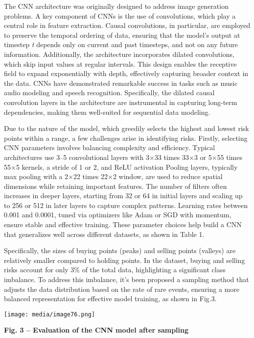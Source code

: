 \documentclass[
]{article}
\begin{document}
The CNN architecture was originally designed to address image generation
problems. A key component of CNNs is the use of convolutions, which play
a central role in feature extraction. Causal convolutions, in
particular, are employed to preserve the temporal ordering of data,
ensuring that the model's output at timestep \emph{t} depends only on
current and past timesteps, and not on any future information.
Additionally, the architecture incorporates dilated convolutions, which
skip input values at regular intervals. This design enables the
receptive field to expand exponentially with depth, effectively
capturing broader context in the data. CNNs have demonstrated remarkable
success in tasks such as music audio modeling and speech recognition.
Specifically, the dilated causal convolution layers in the architecture
are instrumental in capturing long-term dependencies, making them
well-suited for sequential data modeling.

Due to the nature of the model, which greedily selects the highest and
lowest risk points within a range, a few challenges arise in identifying
risks. Firstly, selecting CNN parameters involves balancing complexity
and efficiency. Typical architectures use 3--5 convolutional layers with
3×33 times 33×3 or 5×55 times 55×5 kernels, a stride of 1 or 2, and ReLU
activation Pooling layers, typically max pooling with a 2×22 times 22×2
window, are used to reduce spatial dimensions while retaining important
features. The number of filters often increases in deeper layers,
starting from 32 or 64 in initial layers and scaling up to 256 or 512 in
later layers to capture complex patterns. Learning rates between 0.001
and 0.0001, tuned via optimizers like Adam or SGD with momentum, ensure
stable and effective training. These parameter choices help build a CNN
that generalizes well across different datasets, as shown in Table 1.

Specifically, the sizes of buying points (peaks) and selling points
(valleys) are relatively smaller compared to holding points. In the
dataset, buying and selling risks account for only 3\% of the total
data, highlighting a significant class imbalance. To address this
imbalance, it's been proposed a sampling method that adjusts the data
distribution based on the rate of rare events, ensuring a more balanced
representation for effective model training, as shown in Fig.3.

\texttt{[image: media/image76.png]}

\textbf{Fig. 3 -- Evaluation of the CNN model after sampling}
\end{document}

